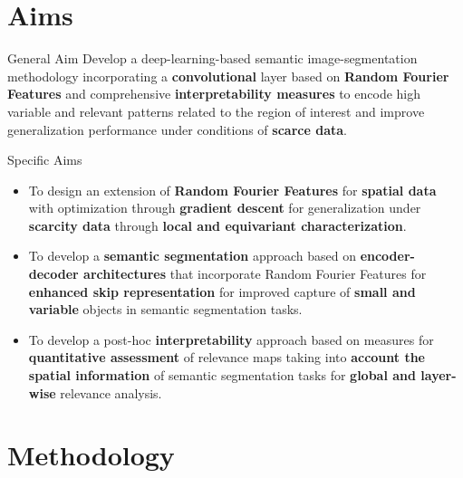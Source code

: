 \documentclass[aspectratio=169]{beamer}
\begin{document}
\section{Aims}

\begin{frame}{General Aim}
    Develop a deep-learning-based semantic image-segmentation methodology incorporating a \textbf{convolutional} layer based on \textbf{Random Fourier Features} and comprehensive \textbf{interpretability measures} to encode high variable and relevant patterns related to the region of interest and improve generalization performance under conditions of \textbf{scarce data}.
\end{frame}


\begin{frame}{Specific Aims}
   \begin{itemize}
    \setlength\itemsep{1em}

        \item To design an extension of \textbf{Random Fourier Features} for \textbf{spatial data} with optimization through \textbf{gradient descent} for generalization under \textbf{scarcity data} through \textbf{local and equivariant characterization}.

        \item To develop a \textbf{semantic segmentation} approach based on \textbf{encoder-decoder architectures} that incorporate Random Fourier Features for \textbf{enhanced skip representation} for improved capture of \textbf{small and variable} objects in semantic segmentation tasks.

 
        \item To develop a post-hoc \textbf{interpretability} approach based on measures for \textbf{quantitative assessment} of relevance maps taking into \textbf{account the spatial information} of semantic segmentation tasks for \textbf{global and layer-wise} relevance analysis.

    \end{itemize}   
\end{frame}


\section{Methodology}
\end{document}
